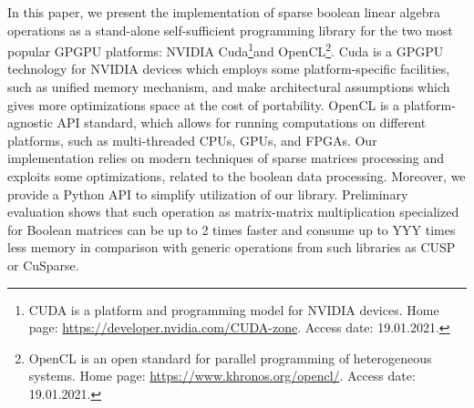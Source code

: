 In this paper, we present the implementation of sparse boolean linear algebra operations as a stand-alone self-sufficient programming library for the two most popular GPGPU platforms: NVIDIA Cuda\footnote{CUDA is a platform and programming model for NVIDIA devices. Home page: \url{https://developer.nvidia.com/CUDA-zone}. Access date: 19.01.2021.}and OpenCL\footnote{OpenCL is an open standard for parallel programming of heterogeneous systems. Home page: \url{https://www.khronos.org/opencl/}. Access date: 19.01.2021.}.
Cuda is a GPGPU technology for NVIDIA devices which employs some platform-specific facilities, such as unified memory mechanism, and make architectural assumptions which gives more optimizations space at the cost of portability.
OpenCL is a platform-agnostic API standard, which allows for running computations on different platforms, such as multi-threaded CPUs, GPUs, and FPGAs.
Our implementation relies on modern techniques of sparse matrices processing and exploits some optimizations, related to the boolean data processing.
Moreover, we provide a Python API to simplify utilization of our library.
Preliminary evaluation shows that such operation as matrix-matrix multiplication specialized for Boolean matrices can be up to 2 times faster and consume up to YYY times less memory in comparison with generic operations from such libraries as CUSP or CuSparse.